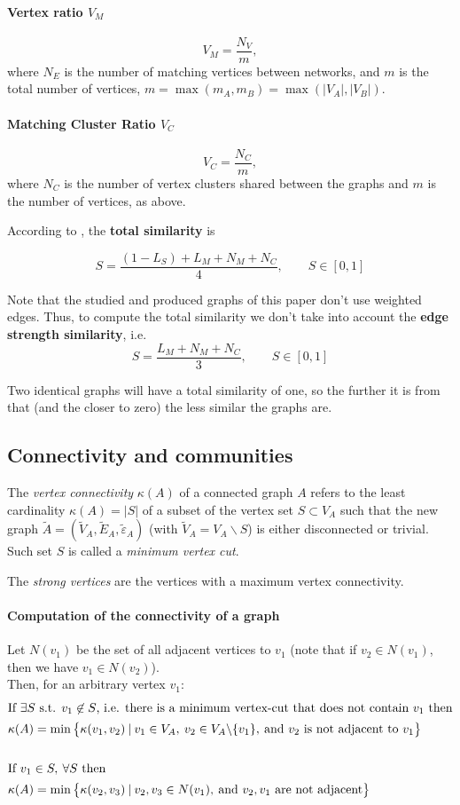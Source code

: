 \documentclass[english, 12pt]{article}
\begin{document}
\paragraph{Vertex ratio $V_M$}
\[V_M = \frac{N_V}{m},\]
where $N_E$ is the number of matching vertices between networks, and $m$ is the total number of vertices, $m = \max(m_A,m_B)=  \max(|V_A|, |V_B|)$.

\paragraph{Matching Cluster Ratio $V_C$}
\[V_C = \frac{N_C}{m},\]
where $N_C$ is the number of vertex clusters shared between the graphs and $m$ is the number of vertices, as above.

According to \cite{2019osti}, the {\bf total similarity} is

$$S = \dfrac{(1-L_S) + L_M + N_M + N_C}{4},\qquad S \in [0,1]$$

Note that the studied and produced graphs of this paper don't use weighted edges. Thus, to compute the total similarity we don't take into account the {\bf edge strength similarity},
i.e.
$$S = \dfrac{L_M + N_M + N_C}{3},\qquad S \in [0,1]$$

Two identical graphs will have a total similarity of one, so the further it is from that (and the closer to zero) the less similar the graphs are.

\subsection{Connectivity and communities}

The {\it vertex connectivity} $\kappa(A)$ of a connected graph $A$ refers to the least cardinality $\kappa(A) = |S|$ of a subset of the vertex set $S \subset V_A$ such that the new graph $\tilde A = (\tilde V_A, \tilde E_A, \tilde \varepsilon_A)$ (with $\tilde V_A = V_A \backslash S$) is either disconnected or trivial.
Such set $S$ is called a {\it minimum vertex cut}.

The {\it strong vertices} are the vertices with a maximum vertex connectivity.
%
\vspace{-.5cm} %
%
\paragraph{Computation of the connectivity of a graph}
Let $N(v_1)$ be the set of all adjacent vertices to $v_1$ (note that if $v_2\in N(v_1)$, then we have $v_1 \in N(v_2)$).\\
Then, for an arbitrary vertex $v_1$:
%
\begin{align*}
\shortintertext{If $\exists S$ s.t. $v_1 \not\in S$, i.e. there is a minimum vertex-cut that does not contain $v_1$ then}
  \kappa(A) &= \min\big\{\kappa(v_1,v_2) \:|\: v_1 \in V_A,\: v_2 \in V_A\backslash\{v_1\},\: \text{and $v_2$ is not adjacent to $v_1$}\big\}\\\\
\shortintertext{If $v_1 \in S,\: \forall S$ then}
  \kappa(A) &= \min\big\{\kappa(v_2,v_3) \:|\: v_2,v_3 \in N(v_1),\:\text{and $v_2,v_1$ are not adjacent}\big\}
\end{align*}
\end{document}

